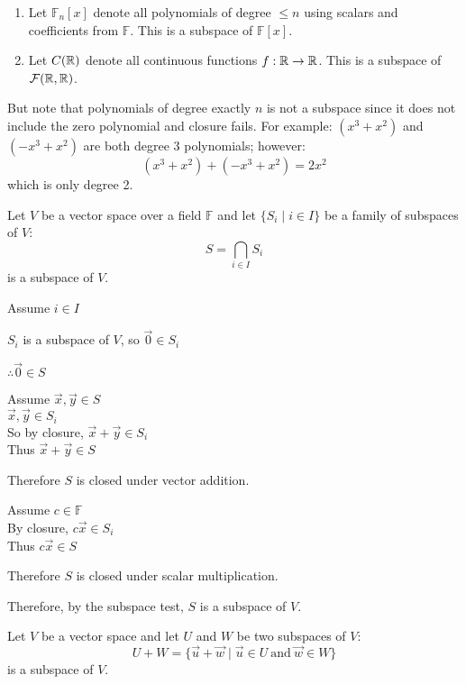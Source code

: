 \documentclass[letterpaper,12pt,fleqn]{article}
\newcommand{\F}{\mathbb{F}}
\newcommand{\vx}{\vec{x}}
\newcommand{\vy}{\vec{y}}
\newcommand{\vu}{\vec{u}}
\newcommand{\vw}{\vec{w}}
\newcommand{\vz}{\vec{0}}
\begin{document}
\newpage

\begin{example}
  \listbreak
  \begin{enumerate}
  \item Let $\F_n[x]$ denote all polynomials of degree $\le n$ using scalars
    and coefficients from $\F$. This is a subspace of $\F[x]$.

  \item Let $C(\mathbb{R})$ denote all continuous functions $f:\mathbb{R}\to\mathbb{R}$. This is a
    subspace of $\mathcal{F}(\mathbb{R},\mathbb{R})$.
  \end{enumerate}

  But note that polynomials of degree exactly $n$ is not a subspace since it
  does not include the zero polynomial and closure fails. For example:
  $(x^3+x^2)$ and $(-x^3+x^2)$ are both degree 3 polynomials; however:
  \[(x^3+x^2)+(-x^3+x^2)=2x^2\]
  which is only degree 2.
\end{example}

\begin{theorem}
  Let $V$ be a vector space over a field $\F$ and let $\{S_i\mid i\in I\}$ be a
  family of subspaces of $V$:
  \[S=\bigcap_{i\in I}S_i\]
  is a subspace of $V$.
\end{theorem}

\begin{theproof}
  Assume $i\in I$

  $S_i$ is a subspace of $V$, so $\vz\in S_i$

  $\therefore \vz\in S$

  Assume $\vx,\vy\in S$ \\
  $\vx,\vy\in S_i$ \\
  So by closure, $\vx+\vy\in S_i$ \\
  Thus $\vx+\vy\in S$

  Therefore $S$ is closed under vector addition.

  Assume $c\in\F$ \\
  By closure, $c\vx\in S_i$ \\
  Thus $c\vx\in S$

  Therefore $S$ is closed under scalar multiplication.

  Therefore, by the subspace test, $S$ is a subspace of $V$.
\end{theproof}

\begin{theorem}
  Let $V$ be a vector space and let $U$ and $W$ be two subspaces of $V$:
  \[U+W=\{\vu+\vw\mid\vu\in U\ \mbox{and}\ \vw\in W\}\]
  is a subspace of $V$.
\end{theorem}
\end{document}
